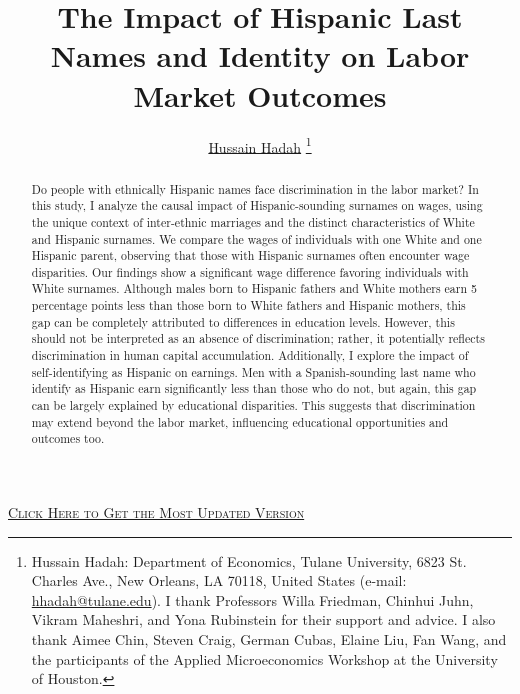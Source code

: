 \documentclass[12pt,english]{article}
\begin{document}
\title{The Impact of Hispanic Last Names and Identity on Labor Market Outcomes}

\author{\href{https://hussainhadah.com/}{Hussain Hadah} \thanks{Hussain Hadah: Department of Economics, Tulane University, 6823 St. Charles Ave., New Orleans, LA 70118, United States (e-mail: \href{mailto:hhadah@tulane.edu}{hhadah@tulane.edu}). I thank Professors Willa Friedman, Chinhui Juhn, Vikram Maheshri, and Yona Rubinstein for their support and advice. I also thank Aimee Chin, Steven Craig, German Cubas, Elaine Liu, Fan Wang, and the participants of the Applied Microeconomics Workshop at the University of Houston.}}


\maketitle

\begin{center}
\href{https://hhadah.github.io/hispanic-last-names/my_paper/Hadah-last-names-draft.pdf}{\textcolor{green!15!black!30!blue}{\footnotesize{\textsc{Click Here to Get the Most Updated Version}}}}
\end{center}

\begin{abstract}
\singlespacing Do people with ethnically Hispanic names face discrimination in the labor market? In this study, I analyze the causal impact of Hispanic-sounding surnames on wages, using the unique context of inter-ethnic marriages and the distinct characteristics of White and Hispanic surnames. We compare the wages of individuals with one White and one Hispanic parent, observing that those with Hispanic surnames often encounter wage disparities. Our findings show a significant wage difference favoring individuals with White surnames. Although males born to Hispanic fathers and White mothers earn 5 percentage points less than those born to White fathers and Hispanic mothers, this gap can be completely attributed to differences in education levels. However, this should not be interpreted as an absence of discrimination; rather, it potentially reflects discrimination in human capital accumulation. Additionally, I explore the impact of self-identifying as Hispanic on earnings. Men with a Spanish-sounding last name who identify as Hispanic earn significantly less than those who do not, but again, this gap can be largely explained by educational disparities. This suggests that discrimination may extend beyond the labor market, influencing educational opportunities and outcomes too.


\end{abstract}
\end{document}
